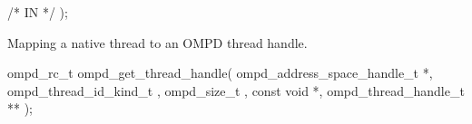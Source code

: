 %
%
\label{ompd:ompd_get_master_thread_in_parallel}
%
%
  /* IN */
);
%
%
%
%
%


\label{ompd:ompd_get_thread_handle}
\summary
Mapping a native thread to an OMPD thread handle.
\format
\begin{cspecific}
\begin{ompSyntax}
	ompd_rc_t ompd_get_thread_handle(
  	ompd_address_space_handle_t *,
  	ompd_thread_id_kind_t           ,
  	ompd_size_t                    ,
  	const void *,
  	ompd_thread_handle_t **
  	);
\end{ompSyntax}
\end{cspecific}

